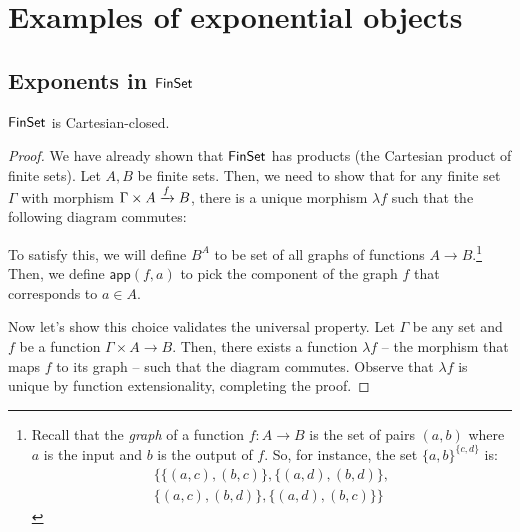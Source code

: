 \section{Examples of exponential objects}

\subsection{Exponents in $\mathsf{FinSet}{}$}

\begin{proposition}
  $\mathsf{FinSet}$ is Cartesian-closed.
\end{proposition}
\begin{proof}
  We have already shown that $\mathsf{FinSet}$ has products (the Cartesian product of
  finite sets). Let $A, B$ be finite sets. Then, we need to show that for 
  any finite set $\Gamma$ with morphism $\Gamma \times A \xrightarrow{f} B$, 
  there is a unique morphism $\lambda f$ such that the following diagram commutes:
  
  \begin{center}
  \end{center}

  To satisfy this, we will define $B^A$ to be set of all graphs of functions $A
  \to B$.\footnote{Recall that the \emph{graph} of a function $f : A \to B$ 
  is the set of pairs $(a, b)$ where $a$ is the input and $b$ is the output 
  of $f$.
  So, for instance, the set $\{a,b\}^{\{c, d\}}$ is:
  \begin{align*}
    \Big\{\{(a, c), (b, c)\}, \{(a, d), (b, d)\}, \\
    \{(a, c), (b, d)\}, \{(a, d), (b, c)\}\Big\}
  \end{align*}
  }
  Then, we define $\mathsf{app}(f, a)$ to pick the component of the 
  graph $f$ that corresponds to $a \in A$. 

  Now let's show this choice validates the universal property.  Let $\Gamma$ be
  any set and $f$ be a function $\Gamma \times A \to B$. Then, there 
  exists a function $\lambda f$ --
  the morphism that maps $f$ to its graph -- such that the diagram commutes.
  Observe that $\lambda f$ is unique by function extensionality, completing the proof.
\end{proof}

